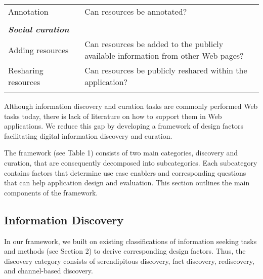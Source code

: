 \documentclass{casconpaper}
\begin{document}
{\begin{table*}[htbp]
\begin{tabular}{|p{0.30\linewidth}|p{0.70\linewidth}|}
Annotation                   & Can resources be annotated?                                                                               \\
&\\
\emph{\textbf{Social curation}}              &                                                                                                           \\
Adding resources             & Can resources be added to the publicly available information from other Web pages?     \\
Resharing resources          & Can resources be publicly reshared within the application?         \\     
&\\          
\hline
\end{tabular}
\end{table*}

Although information discovery and curation tasks are commonly performed Web tasks today, there is lack of literature on how to support them in Web applications. We reduce this gap by developing a framework of design factors facilitating digital information discovery and curation. 

The framework (see Table 1) consists of two main categories, discovery and curation, that are consequently decomposed into subcategories. Each subcategory contains factors that determine use case enablers and corresponding questions that can help application design and evaluation. This section outlines the main components of the framework.

} %

{\subsection{Information Discovery}
In our framework, we built on existing classifications of information seeking tasks and methods (see Section 2) to derive corresponding design factors. Thus, the discovery category consists of serendipitous discovery, fact discovery, rediscovery, and channel-based discovery. 
} %
\end{document}
